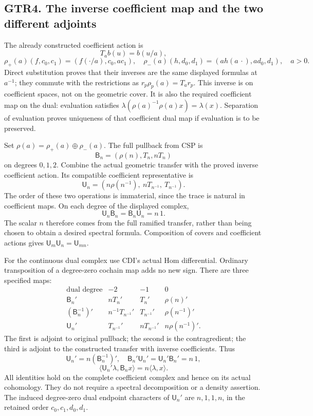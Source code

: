 \subsection{GTR4. The inverse coefficient map and the two different
adjoints}\label{gtr4.-the-inverse-coefficient-map-and-the-two-different-adjoints}

The already constructed coefficient action is \[
T_a b(u)=b(u/a),
\] \[
\rho_+(a)(f,c_0,c_1)=(f(\cdot/a),c_0,ac_1),\quad
\rho_-(a)(h,d_0,d_1)=(a h(a\,\cdot),ad_0,d_1),
\quad a>0.
\tag{GTR4.1}
\] Direct substitution proves that their inverses are the same displayed
formulas at \(a^{-1}\); they commute with the restrictions as
\(r_p\rho_p(a)=T_ar_p\). This inverse is on coefficient spaces, not on
the geometric cover. It is also the required coefficient map on the
dual: evaluation satisfies \(\lambda(\rho(a)^{-1}\rho(a)x)=\lambda(x)\).
Separation of evaluation proves uniqueness of that coefficient dual map
if evaluation is to be preserved.

Set \(\rho(a)=\rho_+(a)\oplus\rho_-(a)\). The full pullback from CSP is
\[
\mathsf B_n=(\rho(n),T_n,nT_n)
\tag{GTR4.2}
\] on degrees \(0,1,2\). Combine the actual geometric transfer with the
proved inverse coefficient action. Its compatible coefficient
representative is \[
\mathsf U_n=(n\rho(n^{-1}),\ nT_{n^{-1}},\ T_{n^{-1}}).
\tag{GTR4.3}
\] The order of these two operations is immaterial, since the trace is
natural in coefficient maps. On each degree of the displayed complex, \[
\boxed{\mathsf U_n\mathsf B_n=\mathsf B_n\mathsf U_n=n\,1.}
\tag{GTR4.4}
\] The scalar \(n\) therefore comes from the full ramified transfer,
rather than being chosen to obtain a desired spectral formula.
Composition of covers and coefficient actions gives
\(\mathsf U_m\mathsf U_n=\mathsf U_{mn}\).

For the continuous dual complex use CDI's actual Hom differential.
Ordinary transposition of a degree-zero cochain map adds no new sign.
There are three specified maps: \[
\begin{array}{c|ccc}
\text{dual degree}&-2&-1&0\\\hline
\mathsf B_n'&nT_n'&T_n'&\rho(n)'\\
(\mathsf B_n^{-1})'&n^{-1}T_{n^{-1}}'&T_{n^{-1}}'&\rho(n^{-1})'\\
\mathsf U_n'&T_{n^{-1}}'&nT_{n^{-1}}'&n\rho(n^{-1})'.
\end{array}
\tag{GTR4.5}
\] The first is adjoint to original pullback; the second is the
contragredient; the third is adjoint to the constructed transfer with
inverse coefficients. Thus \[
\mathsf U_n'=n(\mathsf B_n^{-1})',\quad
\mathsf B_n'\mathsf U_n'=\mathsf U_n'\mathsf B_n'=n\,1,
\] \[
\langle\mathsf U_n'\lambda,\mathsf B_nx\rangle
=n\langle\lambda,x\rangle.
\tag{GTR4.6}
\] All identities hold on the complete coefficient complex and hence on
its actual cohomology. They do not require a spectral decomposition or a
density assertion. The induced degree-zero dual endpoint characters of
\(\mathsf U_n'\) are \(n,1,1,n\), in the retained order
\(c_0,c_1,d_0,d_1\).

